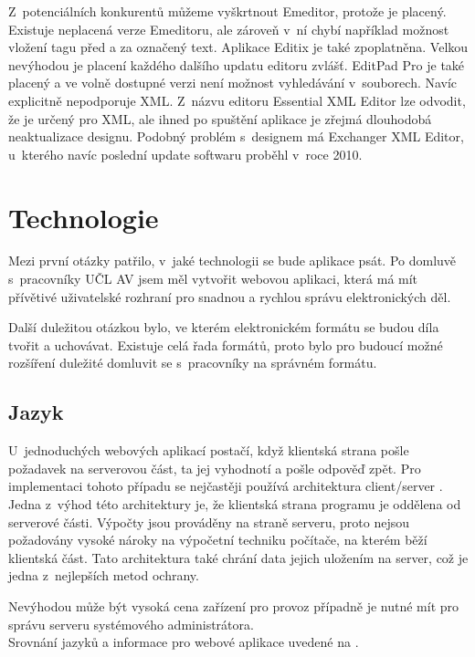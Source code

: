              Z~potenciálních konkurentů můžeme vyškrtnout Emeditor, protože je placený. Existuje neplacená verze Emeditoru, ale zároveň v~ní chybí například možnost vložení tagu před a za označený text. Aplikace Editix je také zpoplatněna. Velkou nevýhodou je placení každého dalšího updatu editoru zvlášť. EditPad Pro je také placený a ve volně dostupné verzi není možnost vyhledávání v~souborech. Navíc explicitně nepodporuje XML. Z~názvu editoru Essential XML Editor lze odvodit, že je určený pro XML, ale ihned po spuštění aplikace je zřejmá dlouhodobá neaktualizace designu. Podobný problém s~designem má Exchanger XML Editor, u~kterého navíc poslední update softwaru proběhl v~roce 2010.
        
            
    \section{Technologie}
        Mezi první otázky patřilo, v~jaké technologii se bude aplikace psát. Po domluvě s~pracovníky UČL AV jsem měl vytvořit webovou aplikaci, která má mít přívětivé uživatelské rozhraní pro snadnou a rychlou správu elektronických děl.
        
        Další duležitou otázkou bylo, ve kterém elektronickém formátu se budou díla tvořit a uchovávat. Existuje celá řada formátů, proto bylo pro budoucí možné rozšíření duležité domluvit se s~pracovníky na správném formátu.
        
        \subsection{Jazyk}
            U~jednoduchých webových aplikací postačí, když klientská strana pošle požadavek na serverovou část, ta jej vyhodnotí a pošle odpověď zpět. Pro implementaci tohoto případu se nejčastěji používá architektura client/server \cite{languages}. 
            Jedna z~výhod této architektury je, že klientská strana programu je oddělena od serverové části. Výpočty jsou prováděny na straně serveru, proto nejsou požadovány vysoké nároky na výpočetní techniku počítače, na kterém běží klientská část. Tato architektura také chrání data jejich uložením na server, což je jedna z~nejlepších metod ochrany.
            
            Nevýhodou může být vysoká cena zařízení pro provoz případně je nutné mít pro správu serveru systémového administrátora.\\
            Srovnání jazyků a informace pro webové aplikace uvedené na \cite{languages}.
            
